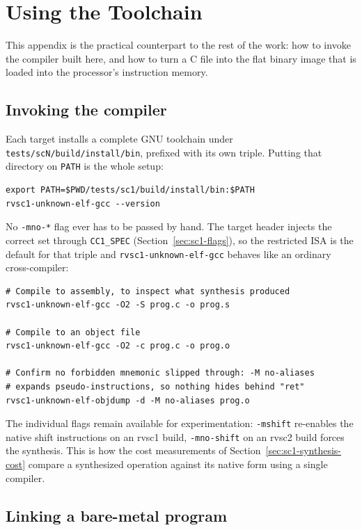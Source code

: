 \chapter{Using the Toolchain} \label{apx:usage}

This appendix is the practical counterpart to the rest of the work: how to invoke the compiler
built here, and how to turn a C file into the flat binary image that is loaded into the
processor's instruction memory.

\section{Invoking the compiler} \label{apx:usage-gcc}

Each target installs a complete GNU toolchain under \nolinkurl{tests/scN/build/install/bin},
prefixed with its own triple. Putting that directory on \texttt{PATH} is the whole setup:

\begin{lstlisting}
export PATH=$PWD/tests/sc1/build/install/bin:$PATH
rvsc1-unknown-elf-gcc --version
\end{lstlisting}

No \texttt{-mno-*} flag ever has to be passed by hand. The target header injects the correct set
through \texttt{CC1\_SPEC} (Section~\ref{sec:sc1-flags}), so the restricted ISA is the
default for that triple and \nolinkurl{rvsc1-unknown-elf-gcc} behaves like an ordinary
cross-compiler:

\begin{lstlisting}
# Compile to assembly, to inspect what synthesis produced
rvsc1-unknown-elf-gcc -O2 -S prog.c -o prog.s

# Compile to an object file
rvsc1-unknown-elf-gcc -O2 -c prog.c -o prog.o

# Confirm no forbidden mnemonic slipped through: -M no-aliases
# expands pseudo-instructions, so nothing hides behind "ret"
rvsc1-unknown-elf-objdump -d -M no-aliases prog.o
\end{lstlisting}

The individual flags remain available for experimentation: \texttt{-mshift} re-enables the native
shift instructions on an rvsc1 build, \texttt{-mno-shift} on an rvsc2 build forces the synthesis.
This is how the cost measurements of Section~\ref{sec:sc1-synthesis-cost} compare a synthesized
operation against its native form using a single compiler.

\section{Linking a bare-metal program} \label{apx:usage-link}

